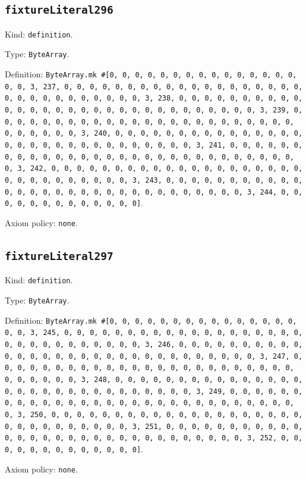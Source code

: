 \documentclass[11pt]{article}
\begin{document}
\subsection*{\texttt{fixtureLiteral296}}
\noindent Kind: \texttt{definition}.\par
\noindent Type: \texttt{ByteArray}.\par
\noindent Definition: \texttt{ByteArray.mk \#[0, 0, 0, 0, 0, 0, 0, 0, 0, 0, 0, 0, 0, 0, 0, 0, 0, 3, 237, 0, 0, 0, 0, 0, 0, 0, 0, 0, 0, 0, 0, 0, 0, 0, 0, 0, 0, 0, 0, 0, 0, 0, 0, 0, 0, 0, 0, 0, 0, 3, 238, 0, 0, 0, 0, 0, 0, 0, 0, 0, 0, 0, 0, 0, 0, 0, 0, 0, 0, 0, 0, 0, 0, 0, 0, 0, 0, 0, 0, 0, 0, 3, 239, 0, 0, 0, 0, 0, 0, 0, 0, 0, 0, 0, 0, 0, 0, 0, 0, 0, 0, 0, 0, 0, 0, 0, 0, 0, 0, 0, 0, 0, 0, 3, 240, 0, 0, 0, 0, 0, 0, 0, 0, 0, 0, 0, 0, 0, 0, 0, 0, 0, 0, 0, 0, 0, 0, 0, 0, 0, 0, 0, 0, 0, 0, 3, 241, 0, 0, 0, 0, 0, 0, 0, 0, 0, 0, 0, 0, 0, 0, 0, 0, 0, 0, 0, 0, 0, 0, 0, 0, 0, 0, 0, 0, 0, 0, 3, 242, 0, 0, 0, 0, 0, 0, 0, 0, 0, 0, 0, 0, 0, 0, 0, 0, 0, 0, 0, 0, 0, 0, 0, 0, 0, 0, 0, 0, 0, 0, 3, 243, 0, 0, 0, 0, 0, 0, 0, 0, 0, 0, 0, 0, 0, 0, 0, 0, 0, 0, 0, 0, 0, 0, 0, 0, 0, 0, 0, 0, 0, 0, 3, 244, 0, 0, 0, 0, 0, 0, 0, 0, 0, 0, 0, 0, 0]}.\par
\noindent Axiom policy: \texttt{none}.\par
\subsection*{\texttt{fixtureLiteral297}}
\noindent Kind: \texttt{definition}.\par
\noindent Type: \texttt{ByteArray}.\par
\noindent Definition: \texttt{ByteArray.mk \#[0, 0, 0, 0, 0, 0, 0, 0, 0, 0, 0, 0, 0, 0, 0, 0, 0, 3, 245, 0, 0, 0, 0, 0, 0, 0, 0, 0, 0, 0, 0, 0, 0, 0, 0, 0, 0, 0, 0, 0, 0, 0, 0, 0, 0, 0, 0, 0, 0, 3, 246, 0, 0, 0, 0, 0, 0, 0, 0, 0, 0, 0, 0, 0, 0, 0, 0, 0, 0, 0, 0, 0, 0, 0, 0, 0, 0, 0, 0, 0, 0, 3, 247, 0, 0, 0, 0, 0, 0, 0, 0, 0, 0, 0, 0, 0, 0, 0, 0, 0, 0, 0, 0, 0, 0, 0, 0, 0, 0, 0, 0, 0, 0, 3, 248, 0, 0, 0, 0, 0, 0, 0, 0, 0, 0, 0, 0, 0, 0, 0, 0, 0, 0, 0, 0, 0, 0, 0, 0, 0, 0, 0, 0, 0, 0, 3, 249, 0, 0, 0, 0, 0, 0, 0, 0, 0, 0, 0, 0, 0, 0, 0, 0, 0, 0, 0, 0, 0, 0, 0, 0, 0, 0, 0, 0, 0, 0, 3, 250, 0, 0, 0, 0, 0, 0, 0, 0, 0, 0, 0, 0, 0, 0, 0, 0, 0, 0, 0, 0, 0, 0, 0, 0, 0, 0, 0, 0, 0, 0, 3, 251, 0, 0, 0, 0, 0, 0, 0, 0, 0, 0, 0, 0, 0, 0, 0, 0, 0, 0, 0, 0, 0, 0, 0, 0, 0, 0, 0, 0, 0, 0, 3, 252, 0, 0, 0, 0, 0, 0, 0, 0, 0, 0, 0, 0, 0]}.\par
\noindent Axiom policy: \texttt{none}.\par
\end{document}
